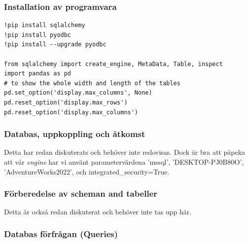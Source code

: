 \documentclass[]{article}
\begin{document}
\subsubsection{Installation av programvara}

\begin{lstlisting}
!pip install sqlalchemy
!pip install pyodbc
!pip install --upgrade pyodbc

from sqlalchemy import create_engine, MetaData, Table, inspect
import pandas as pd
# to show the whole width and length of the tables
pd.set_option('display.max_columns', None)
pd.reset_option('display.max_rows')
pd.reset_option('display.max_columns')
\end{lstlisting}

\subsubsection{Databas, uppkoppling och åtkomst}

Detta har redan diskuterats och behöver inte redovisas. Dock är bra att påpeka att vår \emph{engine} har vi använt parametervärdena 'mssql', 'DESKTOP-PJ0B80O', 'AdventureWorks2022', och integrated\_security=True.

\subsubsection{Förberedelse av scheman and tabeller}
 
 Detta är också redan diskuterat och behöver inte tas upp här.

\subsubsection{Databas förfrågan (Queries)}
\end{document}
